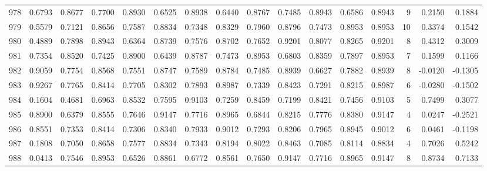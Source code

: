 \begin{tabular}{lrrrrrrrrrrrrrrr}
978 &      0.6793 &  0.8677 &  0.7700 &  0.8930 &  0.6525 &  0.8938 &  0.6440 &  0.8767 &  0.7485 &  0.8943 &   0.6586 &     0.8943 &      9 &                    0.2150 &                     0.1884 \\
979 &      0.5579 &  0.7121 &  0.8656 &  0.7587 &  0.8834 &  0.7348 &  0.8329 &  0.7960 &  0.8796 &  0.7473 &   0.8953 &     0.8953 &     10 &                    0.3374 &                     0.1542 \\
980 &      0.4889 &  0.7898 &  0.8943 &  0.6364 &  0.8739 &  0.7576 &  0.8702 &  0.7652 &  0.9201 &  0.8077 &   0.8265 &     0.9201 &      8 &                    0.4312 &                     0.3009 \\
981 &      0.7354 &  0.8520 &  0.7425 &  0.8900 &  0.6439 &  0.8787 &  0.7473 &  0.8953 &  0.6803 &  0.8359 &   0.7897 &     0.8953 &      7 &                    0.1599 &                     0.1166 \\
982 &      0.9059 &  0.7754 &  0.8568 &  0.7551 &  0.8747 &  0.7589 &  0.8784 &  0.7485 &  0.8939 &  0.6627 &   0.7882 &     0.8939 &      8 &                   -0.0120 &                    -0.1305 \\
983 &      0.9267 &  0.7765 &  0.8414 &  0.7705 &  0.8302 &  0.7893 &  0.8987 &  0.7339 &  0.8423 &  0.7291 &   0.8215 &     0.8987 &      6 &                   -0.0280 &                    -0.1502 \\
984 &      0.1604 &  0.4681 &  0.6963 &  0.8532 &  0.7595 &  0.9103 &  0.7259 &  0.8459 &  0.7199 &  0.8421 &   0.7456 &     0.9103 &      5 &                    0.7499 &                     0.3077 \\
985 &      0.8900 &  0.6379 &  0.8555 &  0.7646 &  0.9147 &  0.7716 &  0.8965 &  0.6844 &  0.8215 &  0.7776 &   0.8380 &     0.9147 &      4 &                    0.0247 &                    -0.2521 \\
986 &      0.8551 &  0.7353 &  0.8414 &  0.7306 &  0.8340 &  0.7933 &  0.9012 &  0.7293 &  0.8206 &  0.7965 &   0.8945 &     0.9012 &      6 &                    0.0461 &                    -0.1198 \\
987 &      0.1808 &  0.7050 &  0.8658 &  0.7577 &  0.8834 &  0.7343 &  0.8194 &  0.8022 &  0.8463 &  0.7085 &   0.8114 &     0.8834 &      4 &                    0.7026 &                     0.5242 \\
988 &      0.0413 &  0.7546 &  0.8953 &  0.6526 &  0.8861 &  0.6772 &  0.8561 &  0.7650 &  0.9147 &  0.7716 &   0.8965 &     0.9147 &      8 &                    0.8734 &                     0.7133 \\

\end{tabular}
